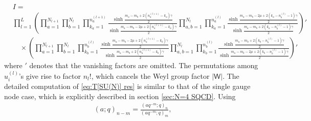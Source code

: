 \documentclass[a4paper,11pt]{article}
\begin{document}
\begin{align}
\label{eq:T[SU(N)] res}
%
& I = \nonumber \\
%
%
& \prod_{l = 1}^{L} \left(\prod_{a = 1}^{N_{l+1}} \prod_{b = 1}^{N_l} \prod_{k_a = 1}^{n^{(l+1)}_a} \frac{\sinh \frac{m_a-m_b+2 (n^{(l+1)}_a-k_a) \gamma}{2}}{\sinh \frac{m_a-m_b-2 \mu+2 (n^{(l+1)}_a-k_a) \gamma}{2}} \prod_{a,b = 1}^{N_l} \prod_{k_a = 1}^{n^{(l)}_a} \frac{\sinh \frac{m_a-m_b-2 \mu+2 (k_a-n^{(l)}_b-1) \gamma}{2}}{\sinh \frac{m_a-m_b+2 (k_a-n^{(l)}_b-1) \gamma}{2}}\right)' \nonumber \\
%
&\quad \times \left(\prod_{a = 1}^{N_{l+1}} \prod_{b = 1}^{N_l} \prod_{k_b = 1}^{n^{(l)}_b} \frac{\sinh \frac{m_a-m_b-2 \mu+2 (n^{(l+1)}_a-k_b) \gamma}{2}}{\sinh \frac{m_a-m_b+2 (n^{(l+1)}_a-k_b) \gamma}{2}} \prod_{a,b = 1}^{N_l} \prod_{k_b = 1}^{n^{(l)}_b} \frac{\sinh \frac{m_a-m_b+2 (k_b-n^{(l)}_b-1) \gamma}{2}}{\sinh \frac{m_a-m_b-2 \mu+2 (k_b-n^{(l)}_b-1) \gamma}{2}}\right)'
%
\end{align}
where $'$ denotes that the vanishing factors are omitted. The permutations among $u^{(l)}_i$'s give rise to factor $n_l!$, which cancels the Weyl group factor $|\mathsf W|$. The detailed computation of \eqref{eq:T[SU(N)] res} is similar to that of the single gauge node case, which is explicitly described in section \ref{sec:N=4 SQCD}. Using
\begin{align}
(a;q)_{n-m} = \frac{(a q^{-m};q)_n}{(a q^{-m};q)_m},
\end{align}
\end{document}
